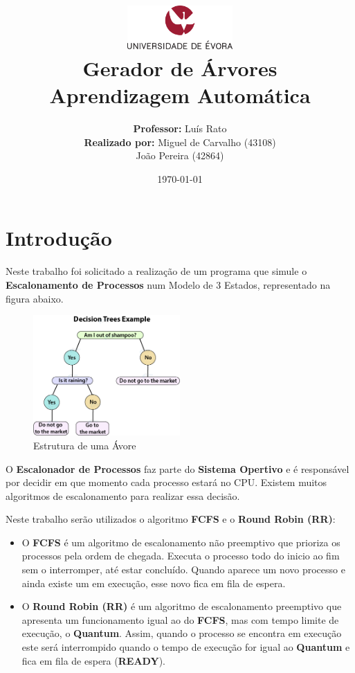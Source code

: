 \documentclass[11pt]{article}   %
\title
{
    \includegraphics[width=0.3\textwidth]{images/logo_universidade.png}
    \\[0.1cm]
    \textbf{Gerador de Árvores} \\
    Aprendizagem Automática
}
\author
{
    \textbf{Professor:} Luís Rato \\
    \textbf{Realizado por:} Miguel de Carvalho (43108) \\ João Pereira (42864) 
}
\date{\today}
\begin{document}
\maketitle

\section{Introdução} 

\hspace{0,5cm}Neste trabalho foi solicitado a realização de um programa que simule o \textbf{Escalonamento de Processos} num Modelo de 3 Estados, representado na figura abaixo. \par
\begin{figure}[h!]
    \begin{center}
	\includegraphics[width=0.5\textwidth]{images/tree-example.png}
        \caption{Estrutura de uma Ávore}
    \end{center}
\end{figure}
O \textbf{Escalonador de Processos} faz parte do \textbf{Sistema Opertivo} e é responsável por decidir em que momento cada processo estará no CPU. 
Existem muitos algoritmos de escalonamento para realizar essa decisão. \par
Neste trabalho serão utilizados o algoritmo \textbf{FCFS} e o \textbf{Round Robin (RR)}:
\begin{itemize}
    \item O \textbf{FCFS} é um algoritmo de escalonamento não preemptivo que prioriza os processos pela ordem de chegada. Executa o processo todo do inicio ao fim sem o interromper, até estar concluído. Quando aparece um novo processo e ainda existe um em execução, esse novo fica em fila de espera.
    \item O \textbf{Round Robin (RR)} é um algoritmo de escalonamento preemptivo que apresenta um funcionamento igual ao do \textbf{FCFS}, mas com tempo limite de execução, o \textbf{Quantum}. Assim, quando o processo se encontra em execução este será interrompido quando o tempo de execução for igual ao \textbf{Quantum} e fica em fila de espera (\textbf{READY}). 
\end{itemize}
\end{document}
